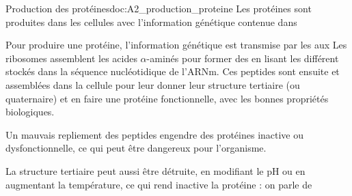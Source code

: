 \newpage
\vspace*{-40pt}
\begin{doc}{Production des protéines}{doc:A2_production_proteine}
  Les protéines sont produites dans les cellules avec l'information génétique contenue dans 
  
  Pour produire une protéine, l'information génétique est transmise par les  aux 
  Les ribosomes assemblent les acides $\alpha$-aminés pour former des  en lisant les différent  stockés dans la séquence nucléotidique de l'ARNm.
  Ces peptides sont ensuite  et assemblées dans la cellule pour leur donner leur structure tertiaire (ou quaternaire) et en faire une protéine fonctionnelle, avec les bonnes propriétés biologiques.

  Un mauvais repliement des peptides engendre des protéines inactive ou dysfonctionnelle, ce qui peut être dangereux pour l'organisme.

  La structure tertiaire peut aussi être détruite, en modifiant le pH ou en augmentant la température, ce qui rend inactive la protéine : on parle de 
\end{doc}


